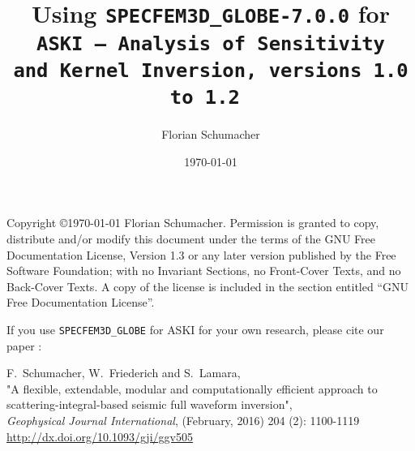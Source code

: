 \documentclass[12pt,a4paper]{article}
\newcommand{\lcode}[1]{\nolinkurl{#1}}
\newcommand{\ASKI}{ {\ttfamily ASKI} }
\begin{document}
\sloppy
%
\setlength{\parindent}{0cm}
\addtolength{\parskip}{0.5em}
%
%
%
\title{Using {\tt \Huge SPECFEM3D\_GLOBE-7.0.0} for \\ \tt {\Huge ASKI} {\rm--} {\Huge A}{\large nalysis of} {\Huge S}{\large ensitivity \\ and} {\Huge\tt K}{\large ernel} {\Huge\tt I}{\large nversion, versions 1.0 to 1.2} }
\author[1]{Florian Schumacher}
\date{\mydate \today}
\maketitle
%
Copyright \copyright {\myyear \today} Florian Schumacher.
Permission is granted to copy, distribute and/or modify this document
under the terms of the GNU Free Documentation License, Version 1.3
or any later version published by the Free Software Foundation;
with no Invariant Sections, no Front-Cover Texts, and no Back-Cover Texts.
A copy of the license is included in the section entitled ``GNU
Free Documentation License''.

\vspace{1cm}

If you use \lcode{SPECFEM3D_GLOBE} for \ASKI{} for your own research, please cite our paper \cite{Schumacher16}:

F.\ Schumacher, W.\ Friederich and S.\ Lamara, \\
"A flexible, extendable, modular and 
computationally efficient approach to scattering-integral-based seismic full waveform 
inversion", \\
\emph{Geophysical Journal International}, (February, 2016) 204 (2): 1100-1119\\
\url{http://dx.doi.org/10.1093/gji/ggv505}
\end{document}
